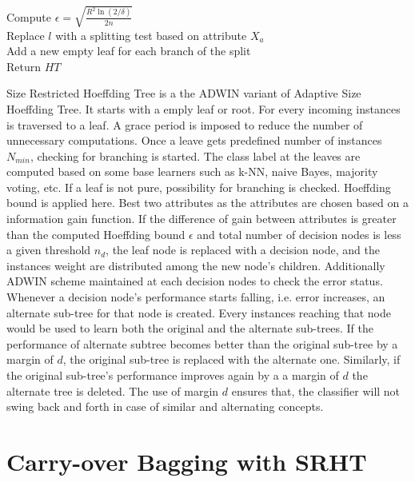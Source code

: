 \begin{algorithm}[htbp]
{{{{                    Compute $\epsilon = \sqrt{\frac{R^2 \ln(2/\delta)}{2n}}$   \\
                    
                     {
                         {
                            Replace $l$ with a splitting test based on attribute $X_a$ \\
                            Add a new empty leaf for each branch of the split \\
                        }
                    }
                }
            }
        }
    Return $HT$
    }
\end{algorithm}

Size Restricted Hoeffding Tree is a the ADWIN variant of Adaptive Size Hoeffding Tree. It starts with a emply leaf or root. For every incoming instances is traversed to a leaf. A grace period is imposed to reduce the number of unnecessary computations. Once a leave gets predefined number of instances $N_{min}$, checking for branching is started. The class label at the leaves are computed based on some base learners such as k-NN, naive Bayes, majority voting, etc. If a leaf is not pure, possibility for branching is checked. Hoeffding bound is applied here. Best two attributes as the attributes are chosen based on a information gain function. If the difference of gain between attributes is greater than the computed Hoeffding bound $\epsilon$ and total number of decision nodes is less a given threshold $n_d$, the leaf node is replaced with a decision node, and the instances weight are distributed among the new node's children. Additionally ADWIN scheme maintained at each decision nodes to check the error status. Whenever a decision node's performance starts falling, i.e. error increases, an alternate sub-tree for that node is created. Every instances reaching that node would be used to learn both the original and the alternate sub-trees. If the performance of alternate subtree becomes better than the original sub-tree by a margin of $d$, the original sub-tree is replaced with the alternate one. Similarly, if the original sub-tree's performance improves again by a a margin of $d$ the alternate tree is deleted. The use of margin $d$ ensures that, the classifier will not swing back and forth in case of similar and alternating concepts.

\section{Carry-over Bagging with SRHT}

